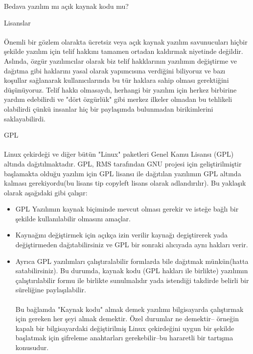 \documentclass[10pt,a5paper]{book}
\begin{document}
\begin{section}{Bedava yazılım mı açık kaynak kodu mu?}
\begin{subsection}{Lisanslar}
\paragraph{}{Önemli bir gözlem olarakta ücretsiz veya açık kaynak yazılım savunucuları hiçbir şekilde  yazılım için telif hakkını tamamen ortadan kaldırmak niyetinde değildir. Aslında, özgür yazılımcılar olarak biz telif hakklarının yazılımın değiştirme ve dağıtma gibi haklarını yasal olarak yapımcısına verdiğini biliyoruz ve bazı koşullar sağlanarak kullanıcılarında bu tür haklara sahip olması gerektiğini düşünüyoruz. Telif hakkı olmasaydı, herhangi bir yazılım için herkez birbirine yardım edebilirdi ve "dört özgürlük" gibi merkez ilkeler olmadan bu tehlikeli olabilirdi çünkü insanlar hiç bir paylaşımda bulunmadan birikimlerini saklayabilirdi.}
\end{subsection}
\begin{subsection}{GPL}
\paragraph{}{Linux çekirdeği ve diğer bütün "Linux" paketleri Genel Kamu Lisansı (GPL) altında dağıtılmaktadır. GPL, RMS tarafından GNU projesi için geliştirilmiştir başlamakta olduğu yazılım için GPL lisansı ile dağıtılan yazılımın GPL altında kalması gerekiyordu(bu lisans tip copyleft lisans olarak adlandırılır). Bu yaklaşık olarak aşağıdaki gibi çalışır:}
\begin{itemize}
 \item GPL Yazılımın kaynak biçiminde mevcut olması gerekir ve isteğe bağlı bir şekilde kullanılabilir olmasını amaçlar.
 \item Kaynağını değiştirmek için açıkça izin verilir kaynağı degiştirerek yada değiştirmeden dağıtabilirsiniz ve GPL bir sonraki alıcıyada aynı hakları verir.
 \item Ayrıca  GPL yazılımları çalıştıralabilir  formlarda bile dağıtmak münkün(hatta satabilirsiniz). Bu durumda, kaynak kodu (GPL hakları ile birlikte) yazılımın çalıştırılabilir formu ile birlikte sunulmalıdır yada istendiği takdirde belirli bir süreliğine paylaşılabilir.
 \paragraph{}{Bu bağlamda "Kaynak kodu" almak demek yazılımı bilgisayarda çalıştırmak için gereken her şeyi almak demektir. Özel durumlar ne demektir-- örneğin kapalı bir bilgisayardaki değiştirilmiş Linux çekirdeğini uygun bir şekilde başlatmak için şifreleme anahtarları gerekebilir--bu hararetli bir tartışma konusudur.}

\end{itemize}
\end{subsection}
\end{section}
\end{document}
